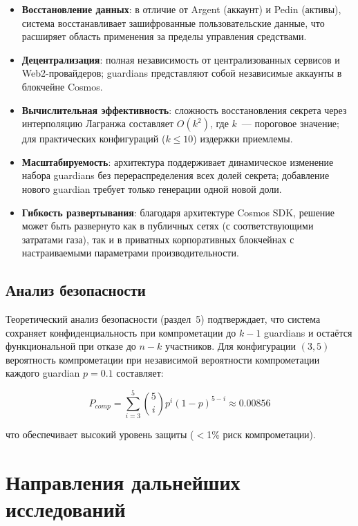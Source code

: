 \begin{itemize}
\item
\textbf{Восстановление данных}: в отличие от Argent (аккаунт) и Pedin (активы), система восстанавливает зашифрованные пользовательские данные, что расширяет область применения за пределы управления средствами.

\item
\textbf{Децентрализация}: полная независимость от централизованных сервисов и Web2-провайдеров; guardians представляют собой независимые аккаунты в блокчейне Cosmos.

\item
\textbf{Вычислительная эффективность}: сложность восстановления секрета через интерполяцию Лагранжа составляет $O(k^2)$, где $k$~--- пороговое значение; для практических конфигураций ($k \leq 10$) издержки приемлемы.

\item
\textbf{Масштабируемость}: архитектура поддерживает динамическое изменение набора guardians без перераспределения всех долей секрета; добавление нового guardian требует только генерации одной новой доли.

\item
\textbf{Гибкость развертывания}: благодаря архитектуре Cosmos SDK, решение может быть развернуто как в публичных сетях (с соответствующими затратами газа), так и в приватных корпоративных блокчейнах с настраиваемыми параметрами производительности.
\end{itemize}

\subsection{Анализ безопасности}

Теоретический анализ безопасности (раздел~5) подтверждает, что система сохраняет конфиденциальность при компрометации до $k-1$ guardians и остаётся функциональной при отказе до $n-k$ участников. Для конфигурации $(3,5)$ вероятность компрометации при независимой вероятности компрометации каждого guardian $p=0.1$ составляет:

$$P_{comp} = \sum_{i=3}^{5} \binom{5}{i} p^i (1-p)^{5-i} \approx 0.00856$$

что обеспечивает высокий уровень защиты ($<$1\% риск компрометации).

\section{Направления дальнейших исследований}

